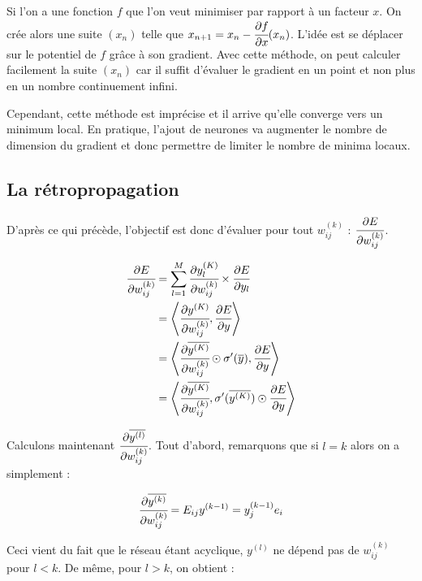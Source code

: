 \medskip

Si l'on a une fonction $f$ que l'on veut minimiser par rapport à un facteur $x$. On crée alors une suite $(x_n)$ telle que
$x_{n+1} = x_{n} - \cfrac{\partial f}{\partial x}(x_n)$. L'idée est se déplacer sur le potentiel de $f$ grâce à son gradient. Avec cette méthode, on peut calculer facilement la suite $(x_n)$ car il suffit d'évaluer le gradient en un point et non plus en un nombre continuement infini.

\medskip

Cependant, cette méthode est imprécise et il arrive qu'elle converge vers un minimum local. En pratique, l'ajout de neurones va augmenter le nombre de dimension du gradient et donc permettre de limiter le nombre de minima locaux.

\medskip

\subsection{La rétropropagation}

D'après ce qui précède, l'objectif est donc d'évaluer pour tout $w_{ij}^{(k)}$ : $\cfrac{\partial E}{\partial w_{ij}^{(k)}}$.

\begin{align*}
\cfrac{\partial E}{\partial w_{ij}^{(k)}} &= \sum_{l = 1}^{M} \cfrac{\partial y_l^{(K)}}{\partial w_{ij}^{(k)}} \times \cfrac{\partial E}{\partial y_l}\\
&= \left\langle\cfrac{\partial y^{(K)}}{\partial w_{ij}^{(k)}},\cfrac{\partial E}{\partial y}\right\rangle\\
&= \left\langle\cfrac{\partial \overline{y^{(K)}}}{\partial w_{ij}^{(k)}} \odot \sigma'(\overline{y}),\cfrac{\partial E}{\partial y}\right\rangle \\
&= \left\langle\cfrac{\partial \overline{y^{(K)}}}{\partial w_{ij}^{(k)}} ,\sigma'(\overline{y^{(K)}}) \odot \cfrac{\partial E}{\partial y}\right\rangle
\end{align*}

Calculons maintenant $\cfrac{\partial \overline{y^{(l)}}}{\partial w_{ij}^{(k)}}$. Tout d'abord, remarquons que si $l = k$ alors on a simplement :

\[\cfrac{\partial \overline{y^{(k)}}}{\partial w_{ij}^{(k)}} = E_{ij} y^{(k-1)} = y^{(k-1)}_j e_i\]

Ceci vient du fait que le réseau étant acyclique, $ y^{(l)}$ ne dépend pas de $w_{ij}^{(k)}$ pour $l < k$. De même, pour $l > k$, on obtient :

